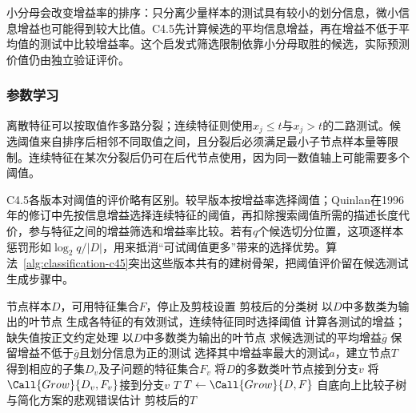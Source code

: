 小分母会改变增益率的排序：只分离少量样本的测试具有较小的划分信息，微小信息增益也可能得到较大比值。C4.5先计算候选的平均信息增益，再在增益不低于平均值的测试中比较增益率。这个启发式筛选限制依靠小分母取胜的候选，实际预测价值仍由独立验证评价。

\subsubsection{参数学习}
\label{sec:classification-c45-learning}

离散特征可以按取值作多路分裂；连续特征则使用$x_j\leq t$与$x_j>t$的二路测试。候选阈值来自排序后相邻不同取值之间，且分裂后必须满足最小子节点样本量等限制。连续特征在某次分裂后仍可在后代节点使用，因为同一数值轴上可能需要多个阈值。

C4.5各版本对阈值的评价略有区别。较早版本按增益率选择阈值；Quinlan在1996年的修订中先按信息增益选择连续特征的阈值，再扣除搜索阈值所需的描述长度代价，参与特征之间的增益筛选和增益率比较。若有$q$个候选切分位置，这项逐样本惩罚形如$\log_2 q/|D|$，用来抵消“可试阈值更多”带来的选择优势。算法~\ref{alg:classification-c45}突出这些版本共有的建树骨架，把阈值评价留在候选测试生成步骤中。

\begin{algorithm}[C4.5的递归生长与后剪枝]
  \label{alg:classification-c45}
  \begin{algorithmic}[1]
    \Require 节点样本$D$，可用特征集合$F$，停止及剪枝设置
    \Ensure 剪枝后的分类树
        \State \Return 以$D$中多数类为输出的叶节点
      \EndIf
      \State 生成各特征的有效测试，连续特征同时选择阈值
      \State 计算各测试的增益；缺失值按正文约定处理
        \State \Return 以$D$中多数类为输出的叶节点
      \EndIf
      \State 求候选测试的平均增益$\bar g$
      \State 保留增益不低于$\bar g$且划分信息为正的测试
      \State 选择其中增益率最大的测试$a$，建立节点$T$
        \State 得到相应的子集$D_v$及子问题的特征集合$F_v$
          \State 将$D$的多数类叶节点接到分支$v$
        \Else
          \State 将$\Call{Grow}{D_v,F_v}$接到分支$v$
        \EndIf
      \EndFor
      \State \Return $T$
    \EndFunction
    \State $T\gets\Call{Grow}{D,F}$
    \State 自底向上比较子树与简化方案的悲观错误估计
    \State \Return 剪枝后的$T$
  \end{algorithmic}
\end{algorithm}

